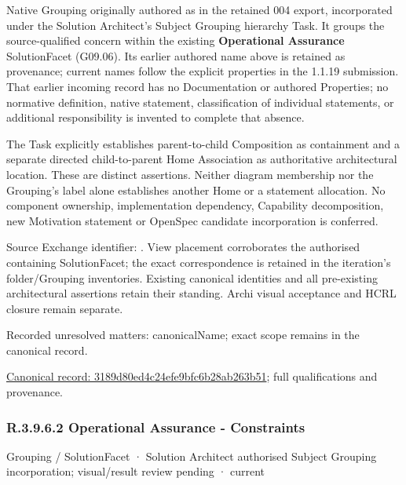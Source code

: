 Native Grouping originally authored as \texttt{} in the retained 004 export,
incorporated under the Solution Architect's Subject Grouping hierarchy Task.
It groups the source-qualified \texttt{} concern within
the existing \textbf{Operational Assurance} SolutionFacet (G09.06). Its earlier authored name above is retained as provenance; current names
follow the explicit properties in the 1.1.19 submission.
That earlier incoming record has no Documentation or authored Properties; no normative
definition, native statement, classification of individual statements, or
additional responsibility is invented to complete that absence.



The Task explicitly establishes parent-to-child Composition as containment and
a separate directed child-to-parent Home Association as authoritative architectural
location. These are distinct assertions. Neither diagram membership nor the
Grouping's label alone establishes another Home or a statement allocation.
No component ownership, implementation dependency, Capability decomposition,
new Motivation statement or OpenSpec candidate incorporation is conferred.



Source Exchange identifier: \texttt{}. View placement corroborates
the authorised containing SolutionFacet; the exact correspondence is retained in the
iteration's folder/Grouping inventories. Existing canonical identities and all
pre-existing architectural assertions retain their standing. Archi visual
acceptance and HCRL closure remain separate.


{\small Recorded unresolved matters: canonicalName; exact scope remains in the canonical record.}\par
{\footnotesize \href{../../../../../../../continuum/grouping/3189d80ed4c24efe9bfc6b28ab263b51.md}{Canonical record: 3189d80ed4c24efe9bfc6b28ab263b51}; full qualifications and provenance.}\par
\subsubsection*{R.3.9.6.2 Operational Assurance - Constraints}
\label{navigation:R.3.9.6.2}

\label{element:793ed649804a4bf19b5fa92bac3e4c29}
{\small Grouping / SolutionFacet · Solution Architect authorised Subject Grouping incorporation; visual/result review pending · current}\par

